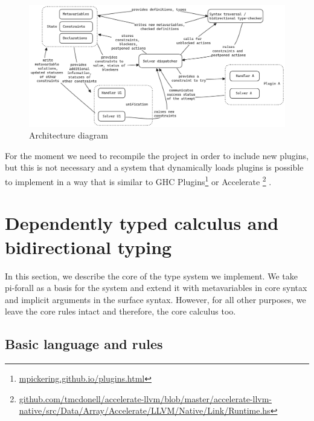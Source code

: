 \documentclass[
  sigconf,
  screen,
  review]{acmart}
\begin{document}
\begin{figure}
  \center

  \includegraphics[width=\textwidth]{architecture-diagram.png}

  \caption{Architecture diagram}
  \label{architecture-figure}
\end{figure}

For the moment we need to recompile the project in order to include new
plugins, but this is not necessary and a system that dynamically loads
plugins is possible to implement in a way that is similar to GHC
Plugins\footnote{\href{https://mpickering.github.io/plugins.html}{mpickering.github.io/plugins.html}}
or Accelerate \footnote{\href{https://github.com/tmcdonell/accelerate-llvm/blob/master/accelerate-llvm-native/src/Data/Array/Accelerate/LLVM/Native/Link/Runtime.hs\#L40}{github.com/tmcdonell/accelerate-llvm/blob/master/accelerate-llvm-native/src/Data/Array/Accelerate/LLVM/Native/Link/Runtime.hs}}
\citep{mcdonellTypesafeRuntimeCode2015}.

\hypertarget{sec:bidirectional}{%
\section{Dependently typed calculus and bidirectional
typing}\label{sec:bidirectional}}

In this section, we describe the core of the type system we implement.
We take pi-forall \citep{weirichImplementingDependentTypes2022} as a
basis for the system and extend it with metavariables in core syntax and
implicit arguments in the surface syntax. However, for all other
purposes, we leave the core rules intact and therefore, the core
calculus too.

\hypertarget{basic-language-and-rules}{%
\subsection{Basic language and rules}\label{basic-language-and-rules}}
\end{document}
